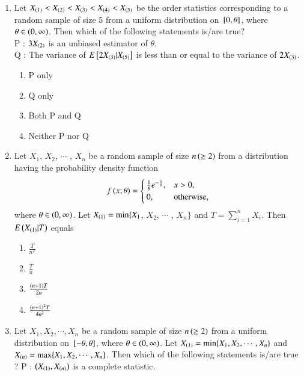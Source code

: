 \documentclass[journal]{IEEEtran}
\begin{document}
\begin{enumerate}
\item Let $X_{\left(1\right)} < X_{\left(2\right)} < X_{\left(3\right)} < X_{\left(4\right)} < X_{\left(5\right)}$ be the order statistics corresponding to a random sample of size 5 from a uniform distribution on ${}\left[0, \theta\right]$, where $\theta \in \left(0, \infty\right)$. Then which of the following statements is/are true?\\
P : $3X_{\left(2\right)}$ is an unbiased estimator of $\theta$.\\
Q : The variance of $E{}\left[2X_{\left(3\right)}|X_{\left(5\right)}\right]$ is less than or equal to the variance of $2X_{\left(3\right)}$.
\begin{enumerate}
    \item P only
    \item Q only
    \item Both P and Q
    \item Neither P nor Q \\ 
\end{enumerate}
\item Let $X_1$, $X_2$, $\cdots$ , $X_n$ be a random sample of size $n\left(\geq 2\right)$ from a distribution having the probability density function
\begin{align*}
    f\left(x;\theta\right) = \begin{cases}
        \frac{1}{\theta}e^{-\frac{x}{\theta}}, & x > 0, \\
        0, & \text{otherwise},
    \end{cases}
\end{align*}
where $\theta\in\left(0, \infty\right)$. Let $X_{\left(1\right)} = \min\{X_1$, $X_2$, $\cdots$ , $X_n\}$ and $T = \sum_{i=1}^nX_i$. Then $E\left(X_{\left(1\right)}|T\right)$ equals
\begin{enumerate}
    \item $\frac{T}{n^2}$
    \item $\frac{T}{n}$
    \item $\frac{\left(n+1\right)T}{2n}$
    \item $\frac{\left(n+1\right)^2T}{4n^2}$ \\
\end{enumerate}
\item Let $X_1, X_2, \cdots, X_n$ be a random sample of size $n\left(\geq 2\right)$ from a uniform distribution on ${}\left[-\theta, \theta\right]$, where $\theta \in \left(0, \infty\right)$. Let $X_{\left(1\right)} = \min\{X_1, X_2, \cdots, X_n\}$ and $X_{\left(n\right)} = \max\{X_1, X_2, \cdots, X_n\} $. Then which of the following statements is/are true ?
P : $\left(X_{\left(1\right)}, X_{\left(n\right)}\right)$ is a complete statistic. \\

\end{enumerate}
\end{document}
